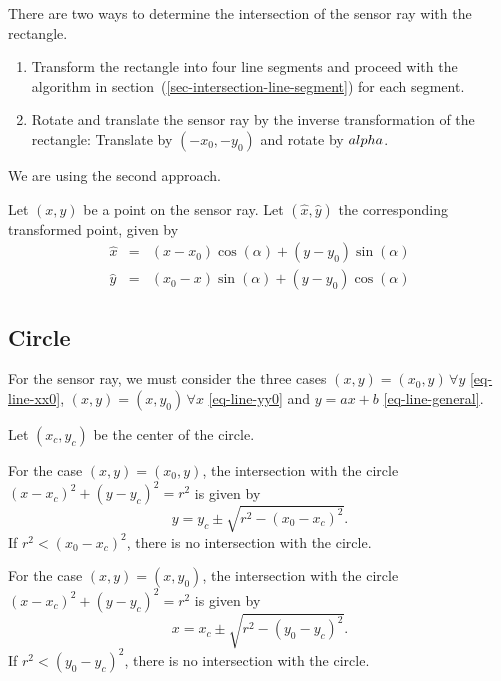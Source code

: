 \documentclass[11pt]{article}
\newcommand{\xhat}{{\hat{x}}}
\newcommand{\yhat}{{\hat{y}}}
\begin{document}
There are two ways to determine the intersection of the sensor ray with the
rectangle.
\begin{enumerate}
    \item Transform the rectangle into four line segments and
        proceed with the algorithm in
        section~(\ref{sec-intersection-line-segment}) for each segment.
    \item Rotate and translate the sensor ray by the inverse transformation of
        the rectangle: Translate by $(-x_0, -y_0)$ and rotate by $\-alpha$.
\end{enumerate}
We are using the second approach.

Let $(x, y)$ be a point on the sensor ray. Let $(\xhat, \yhat)$ the
corresponding transformed point, given by
\begin{eqnarray}
    \xhat &=& (x - x_0) \cos(\alpha) + (y - y_0) \sin(\alpha) \\
    \yhat &=& (x_0 - x) \sin(\alpha) + (y - y_0) \cos(\alpha)
\end{eqnarray}

\subsection{Circle}
\label{sec-intersection-circle}
For the sensor ray, we must consider the three cases $(x,y)=(x_0,y)\,\forall y$
\eqref{eq-line-xx0}, $(x,y)=(x,y_0)\,\forall x$ \eqref{eq-line-yy0} and $y=ax+b$
\eqref{eq-line-general}.

Let $(x_c, y_c)$ be the center of the circle.

For the case $(x,y)=(x_0, y)$, the intersection with the circle
$(x-x_c)^2+(y-y_c)^2=r^2$ is given by
\begin{equation}
    y = y_c \pm\sqrt{r^2 - (x_0-x_c)^2}.
\end{equation}
If $r^2 < (x_0-x_c)^2$, there is no intersection with the circle.

For the case $(x,y)=(x, y_0)$, the intersection with the circle
$(x-x_c)^2+(y-y_c)^2=r^2$ is given by
\begin{equation}
    x = x_c \pm\sqrt{r^2 - (y_0-y_c)^2}.
\end{equation}
If $r^2 < (y_0-y_c)^2$, there is no intersection with the circle.
\end{document}
